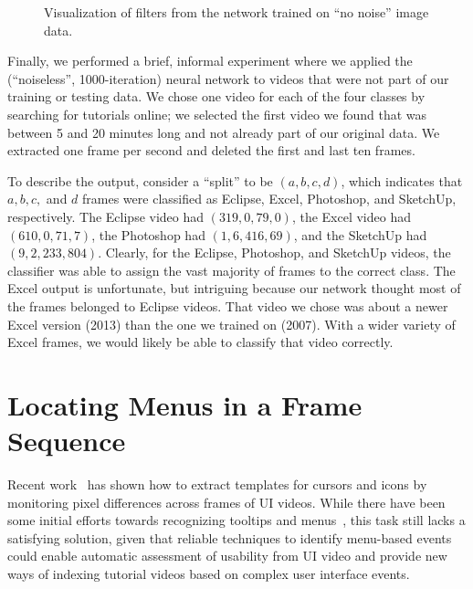 \documentclass[10pt]{article}
\begin{document}
\begin{figure}[t]
\begin{minipage}{.35\textwidth}
  \caption{Visualization of filters from the network trained on ``no noise'' image data.}
  \label{fig:filters_nonoise}
  \end{minipage}
\end{figure}

Finally, we performed a brief, informal experiment where we applied the (``noiseless'',
1000-iteration) neural network to videos that were not part of our training or testing data. We
chose one video for each of the four classes by searching for tutorials online; we selected the
first video we found that was between 5 and 20 minutes long and not already part of our original
data. We extracted one frame per second and deleted the first and last ten frames.

To describe the output, consider a ``split'' to be $(a,b,c,d)$, which indicates that $a, b, c,$ and
$d$ frames were classified as Eclipse, Excel, Photoshop, and SketchUp, respectively.  The Eclipse
video had $(319,0,79,0)$, the Excel video had $(610,0,71,7)$, the Photoshop had $(1,6,416,69)$, and
the SketchUp had $(9,2,233,804)$. Clearly, for the Eclipse, Photoshop, and SketchUp videos, the
classifier was able to assign the vast majority of frames to the correct class. The Excel output is
unfortunate, but intriguing because our network thought most of the frames belonged to Eclipse
videos. That video we chose was about a newer Excel version (2013) than the one we trained on
(2007).  With a wider variety of Excel frames, we would likely be able to classify that video
correctly.

\section{Locating Menus in a Frame Sequence}\label{andrew}

Recent work~\cite{banovic_waken_2012} has shown how to extract templates for cursors and icons by
monitoring pixel differences across frames of UI videos.  While there have been some initial efforts
towards recognizing tooltips and menus~\cite{banovic_waken_2012}, this task still lacks a
satisfying solution, given that reliable techniques to identify menu-based events could enable
automatic assessment of usability from UI video and provide new ways of indexing tutorial videos
based on complex user interface events.
\end{document}
